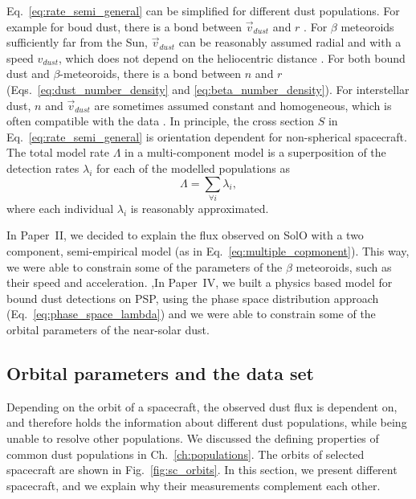 Eq.~\ref{eq:rate_semi_general} can be simplified for different dust populations. For example for boud dust, there is a bond between $\vec{v}_{dust}$ and $r$ \citep{szalay2020near}. For $\beta$ meteoroids sufficiently far from the Sun, $\vec{v}_{dust}$ can be reasonably assumed radial and with a speed $v_{dust}$, which does not depend on the heliocentric distance \citep{zaslavsky2021first}. For both bound dust and $\beta$-meteoroids, there is a bond between $n$ and $r$ (Eqs.~\ref{eq:dust_number_density} and \ref{eq:beta_number_density}). For interstellar dust, $n$ and $\vec{v}_{dust}$ are sometimes assumed constant and homogeneous, which is often compatible with the data \citep{babic2022situ}. In principle, the cross section $S$ in Eq.~\ref{eq:rate_semi_general} is orientation dependent for non-spherical spacecraft. 
The total model rate $\Lambda$ in a multi-component model is a superposition of the detection rates $\lambda_i$ for each of the modelled populations as
\begin{equation}
    \Lambda = \sum_{\forall i} \lambda_i, \label{eq:multiple_copmonent}
\end{equation}
where each individual $\lambda_i$ is reasonably approximated. 

In Paper~II, we decided to explain the flux observed on SolO with a two component, semi-empirical model (as in Eq.~\ref{eq:multiple_copmonent}). This way, we were able to constrain some of the parameters of the $\beta$ meteoroids, such as their speed and acceleration. ,In Paper~IV, we built a physics based model for bound dust detections on PSP, using the phase space distribution approach (Eq.~\ref{eq:phase_space_lambda}) and we were able to constrain some of the orbital parameters of the near-solar dust. 

\subsection{Orbital parameters and the data set}

Depending on the orbit of a spacecraft, the observed dust flux is dependent on, and therefore holds the information about different dust populations, while being unable to resolve other populations. We discussed the defining properties of common dust populations in Ch.~\ref{ch:populations}. The orbits of selected spacecraft are shown in Fig.~\ref{fig:sc_orbits}. In this section, we present different spacecraft, and we explain why their measurements complement each other.  

